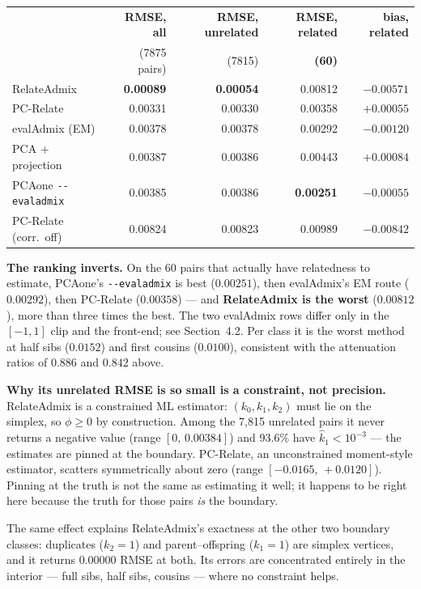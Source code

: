 \documentclass[10pt,a4paper]{article}
\begin{document}
\begin{center}
\small
\begin{tabular}{@{}lrrrr@{}}
\toprule
 & \textbf{RMSE, all} & \textbf{RMSE, unrelated} & \textbf{RMSE, related} & \textbf{bias, related} \\
 & (7875 pairs) & (7815) & \textbf{(60)} & \\
\midrule
RelateAdmix              & \textbf{0.00089} & \textbf{0.00054} & 0.00812 & $-0.00571$ \\
PC-Relate                & 0.00331 & 0.00330 & 0.00358 & $+0.00055$ \\
evalAdmix (EM)           & 0.00378 & 0.00378 & 0.00292 & $-0.00120$ \\
PCA $+$ projection       & 0.00387 & 0.00386 & 0.00443 & $+0.00084$ \\
PCAone \texttt{-{}-evaladmix} & 0.00385 & 0.00386 & \textbf{0.00251} & $-0.00055$ \\
PC-Relate (corr.\ off)   & 0.00824 & 0.00823 & 0.00989 & $-0.00842$ \\
\bottomrule
\end{tabular}
\end{center}

\noindent
\textbf{The ranking inverts.} On the 60 pairs that actually have relatedness to estimate, PCAone's
\texttt{-{}-evaladmix} is best ($0.00251$), then evalAdmix's EM route ($0.00292$), then PC-Relate
($0.00358$) --- and \textbf{RelateAdmix is the worst} ($0.00812$), more than three times the best. The two
evalAdmix rows differ only in the $[-1,1]$ clip and the front-end; see Section~4.2. Per class it is the worst method
at half sibs ($0.0152$) and first cousins ($0.0100$), consistent with the attenuation ratios of $0.886$ and
$0.842$ above.

\textbf{Why its unrelated RMSE is so small is a constraint, not precision.} RelateAdmix is a constrained ML
estimator: $(k_0,k_1,k_2)$ must lie on the simplex, so $\phi\ge0$ by construction. Among the 7{,}815
unrelated pairs it never returns a negative value (range $[0,\,0.00384]$) and 93.6\% have
$\hat k_1<10^{-3}$ --- the estimates are pinned at the boundary. PC-Relate, an unconstrained moment-style
estimator, scatters symmetrically about zero (range $[-0.0165,\,+0.0120]$). Pinning at the truth is not the
same as estimating it well; it happens to be right here because the truth for those pairs \emph{is} the
boundary.

The same effect explains RelateAdmix's exactness at the other two boundary classes: duplicates
($k_2=1$) and parent--offspring ($k_1=1$) are simplex vertices, and it returns $0.00000$ RMSE at both.
Its errors are concentrated entirely in the interior --- full sibs, half sibs, cousins --- where no
constraint helps.
\end{document}
